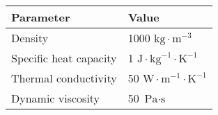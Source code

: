 
\begin{tabular}{l l}
	\toprule

	Parameter & Value  \\

	\midrule

	Density                & 1000 $ \text{kg} \cdot \text{m}^{-3} $ \\
	Specific heat capacity & 1 $ \text{J} \cdot \text{kg}^{-1} \cdot \text{K}^{-1} $ \\
	Thermal conductivity   & 50 $ \text{W} \cdot \text{m}^{-1} \cdot \text{K}^{-1} $ \\
    Dynamic viscosity      & 50 $ \text{Pa} \cdot \text{s} $ \\

	\bottomrule
\end{tabular}
